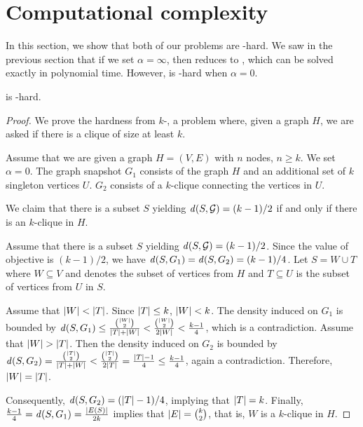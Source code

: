 \section{Computational complexity}\label{sec:compl}

In this section, we show that both of our problems are \np-hard.
We saw in the previous section that if
we set $\alpha  = \infty$, then \problemcdcsm reduces to \problemdts, which can be solved exactly in
polynomial time. However, \problemcdcsm is \np-hard when $\alpha = 0$.


\begin{proposition} 
\label{prop:np}
\problemcdcsm is \np-hard.
\end{proposition} 
\begin{proof}
We prove the hardness from $k$-\prbclique, a problem where, given a graph $H$, we are asked if there is a clique of size at least $k$.

Assume that we are given a graph $H = (V, E)$ with $n$ nodes, $n \geq k$. We set $\alpha = 0$.
The graph snapshot $G_1$ consists of the
graph $H$ and an additional set of $k$ singleton vertices $U$. $G_2$ consists of a $k$-clique connecting the vertices in $U$. 

We claim that there is a subset $S$ yielding $\dens{S, \calG} =  (k - 1)/2$ if and only if there is an $k$-clique in $H$.

Assume that  there is a subset $S$ yielding $\dens{S, \calG} =  (k - 1)/2$.
Since the value of objective is $(k - 1)/2$, we have $\dens{S, G_1} = \dens{S, G_2} = (k - 1)/4$. 
Let $S = W \cup T$ where $W \subseteq V$ and denotes the subset of vertices from $H$ and $T \subseteq U$ is the subset of vertices from  $U$ in $S$. 

Assume that ${\left|W\right|} < {\left|T\right|}$. Since ${\left|T\right|} \leq k$, ${\left|W\right|} < k$.  The density induced on $G_1$ is bounded by $\dens{S, G_1} \leq \frac{{\abs{W} \choose 2}}{\abs{T} + \abs{W}} < \frac{{\abs{W} \choose 2}}{2\abs{W}} < \frac{k - 1}{4}$, which is a contradiction.
Assume that  ${\left|W\right|} > {\left|T\right|}$. Then the density induced on $G_2$ is bounded by $\dens{S, G_2} = \frac{{\abs{T} \choose 2}}{\abs{T} + \abs{W}} < \frac{{\abs{T} \choose 2}}{2\abs{T}} = \frac{\abs{T} - 1}{4} \leq \frac{k - 1}{4}$, again a contradiction. Therefore, ${\left|W\right|} =  {\left|T\right|}$. 

Consequently, $\dens{S, G_2} = (\abs{T} - 1)/4$, implying that ${\left|T\right|} = k$. Finally, $\frac{k - 1}{4} = \dens{S, G_1} = \frac{\abs{E(S)}}{2k}$ implies that ${\left|E\right|} = {k \choose 2}$, that is, $W$ is a $k$-clique in $H$.


\end{proof}
